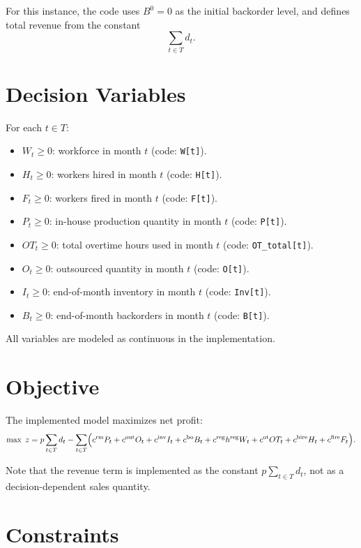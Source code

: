 For this instance, the code uses \(B^0=0\) as the initial backorder level, and defines total revenue from the constant
\[
\sum_{t\in T} d_t.
\]

\section*{Decision Variables}

For each \(t \in T\):

\begin{itemize}
    \item \(W_t \ge 0\): workforce in month \(t\) (code: \texttt{W[t]}).
    \item \(H_t \ge 0\): workers hired in month \(t\) (code: \texttt{H[t]}).
    \item \(F_t \ge 0\): workers fired in month \(t\) (code: \texttt{F[t]}).
    \item \(P_t \ge 0\): in-house production quantity in month \(t\) (code: \texttt{P[t]}).
    \item \(OT_t \ge 0\): total overtime hours used in month \(t\) (code: \texttt{OT\_total[t]}).
    \item \(O_t \ge 0\): outsourced quantity in month \(t\) (code: \texttt{O[t]}).
    \item \(I_t \ge 0\): end-of-month inventory in month \(t\) (code: \texttt{Inv[t]}).
    \item \(B_t \ge 0\): end-of-month backorders in month \(t\) (code: \texttt{B[t]}).
\end{itemize}

All variables are modeled as continuous in the implementation.

\section*{Objective}

The implemented model maximizes net profit:
\[
\max \; z
=
p\sum_{t\in T} d_t
-\sum_{t\in T}\Bigl(
c^{\mathrm{rm}} P_t
+c^{\mathrm{out}} O_t
+c^{\mathrm{inv}} I_t
+c^{\mathrm{bo}} B_t
+c^{\mathrm{reg}} h^{\mathrm{reg}} W_t
+c^{\mathrm{ot}} OT_t
+c^{\mathrm{hire}} H_t
+c^{\mathrm{fire}} F_t
\Bigr).
\]

Note that the revenue term is implemented as the constant \(p\sum_{t\in T} d_t\), not as a decision-dependent sales quantity.

\section*{Constraints}

